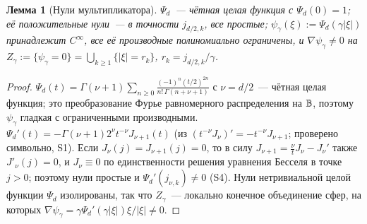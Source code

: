 \documentclass[11pt,a4paper]{article}
\numberwithin{equation}{section}
\newtheorem{lemma}[theorem]{Лемма}
\theoremstyle{definition}
\theoremstyle{remark}
\begin{document}
\begin{lemma}[Нули мультипликатора]\label{lem:zeros}
$\Psi_d$~--- чётная целая функция с $\Psi_d(0)=1$; её положительные нули~--- в точности $j_{d/2,k}$, все простые; $\psi_\gamma(\xi):=\Psi_d(\gamma|\xi|)$ принадлежит $C^\infty$, все её производные полиномиально ограничены, и $\nabla\psi_\gamma\ne0$ на $Z_\gamma:=\{\psi_\gamma=0\}=\bigcup_{k\ge1}\{|\xi|=r_k\}$, $r_k=j_{d/2,k}/\gamma$.
\end{lemma}
\begin{proof}
$\Psi_d(t)=\Gamma(\nu+1)\sum_{n\ge0}\frac{(-1)^n(t/2)^{2n}}{n!\,\Gamma(n+\nu+1)}$ с $\nu=d/2$~--- чётная целая функция; это преобразование Фурье равномерного распределения на $\mathbb B$, поэтому $\psi_\gamma$ гладкая с ограниченными производными. $\Psi_d'(t)=-\Gamma(\nu+1)2^\nu t^{-\nu}J_{\nu+1}(t)$ (из $(t^{-\nu}J_\nu)'=-t^{-\nu}J_{\nu+1}$; проверено символьно, S1). Если $J_\nu(j)=J_{\nu+1}(j)=0$, то в силу $J_{\nu+1}=\frac\nu tJ_\nu-J_\nu'$ также $J'_\nu(j)=0$, и $J_\nu\equiv0$ по единственности решения уравнения Бесселя в точке $j>0$; поэтому нули простые и $\Psi_d'(j_{\nu,k})\ne0$ (S4). Нули нетривиальной целой функции $\Psi_d$ изолированы, так что $Z_\gamma$~--- локально конечное объединение сфер, на которых $\nabla\psi_\gamma=\gamma\Psi_d'(\gamma|\xi|)\xi/|\xi|\neq0$.
\end{proof}
\end{document}
